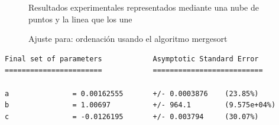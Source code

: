 
\begin{figure}[H]%
    \centering
    \caption{Resultados experimentales representados mediante una nube de puntos y la linea que los une}%
    \centering
    \caption{Ajuste para: ordenación usando el algoritmo mergesort}%
\end{figure}

\begin{verbatim}
Final set of parameters            Asymptotic Standard Error
=======================            ==========================

a               = 0.00162555       +/- 0.0003876    (23.85%)
b               = 1.00697          +/- 964.1        (9.575e+04%)
c               = -0.0126195       +/- 0.003794     (30.07%)


\end{verbatim}
